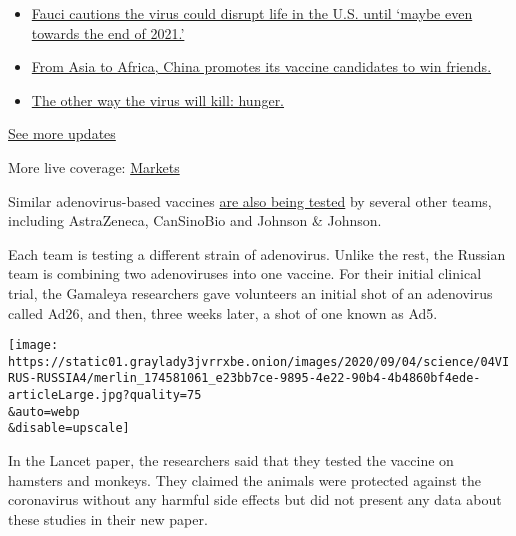 \begin{itemize}
\tightlist
\item
  \href{https://www.nytimes3xbfgragh.onion/2020/09/11/world/covid-19-coronavirus.html?action=click\&pgtype=Article\&state=default\&region=MAIN_CONTENT_1\&context=storylines_live_updates\#link-dfb8a16}{Fauci
  cautions the virus could disrupt life in the U.S. until `maybe even
  towards the end of 2021.'}
\item
  \href{https://www.nytimes3xbfgragh.onion/2020/09/11/world/covid-19-coronavirus.html?action=click\&pgtype=Article\&state=default\&region=MAIN_CONTENT_1\&context=storylines_live_updates\#link-7104d154}{From
  Asia to Africa, China promotes its vaccine candidates to win friends.}
\item
  \href{https://www.nytimes3xbfgragh.onion/2020/09/11/world/covid-19-coronavirus.html?action=click\&pgtype=Article\&state=default\&region=MAIN_CONTENT_1\&context=storylines_live_updates\#link-393ad215}{The
  other way the virus will kill: hunger.}
\end{itemize}

\href{https://www.nytimes3xbfgragh.onion/2020/09/11/world/covid-19-coronavirus.html?action=click\&pgtype=Article\&state=default\&region=MAIN_CONTENT_1\&context=storylines_live_updates}{See
more updates}

More live coverage:
\href{https://www.nytimes3xbfgragh.onion/live/2020/09/11/business/stock-market-today-coronavirus?action=click\&pgtype=Article\&state=default\&region=MAIN_CONTENT_1\&context=storylines_live_updates}{Markets}

Similar adenovirus-based vaccines
\href{https://www.nytimes3xbfgragh.onion/interactive/2020/science/coronavirus-vaccine-tracker.html}{are
also being tested} by several other teams, including AstraZeneca,
CanSinoBio and Johnson \& Johnson.

Each team is testing a different strain of adenovirus. Unlike the rest,
the Russian team is combining two adenoviruses into one vaccine. For
their initial clinical trial, the Gamaleya researchers gave volunteers
an initial shot of an adenovirus called Ad26, and then, three weeks
later, a shot of one known as Ad5.

\texttt{[image: https://static01.graylady3jvrrxbe.onion/images/2020/09/04/science/04VIRUS-RUSSIA4/merlin\_174581061\_e23bb7ce-9895-4e22-90b4-4b4860bf4ede-articleLarge.jpg?quality=75\\\&auto=webp\\\&disable=upscale]}

In the Lancet paper, the researchers said that they tested the vaccine
on hamsters and monkeys. They claimed the animals were protected against
the coronavirus without any harmful side effects but did not present any
data about these studies in their new paper.

